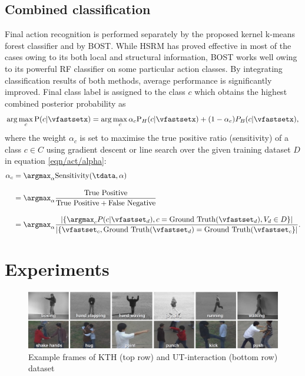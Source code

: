 \subsection{Combined classification} 
Final action recognition is performed separately by the proposed kernel k-means forest classifier and by BOST. While HSRM has proved effective in most of the cases owing to its both local and structural information, BOST works well owing to its powerful RF classifier on some particular action classes. By integrating classification results of both methods, average performance is significantly improved. Final class label is assigned to the class $c$ which obtains the highest combined posterior probability as
\begin{equation}
	\arg\max_{c}
	\mathrm{P}(c|\vfastsetx) = 
	\arg\max_{c}
	\alpha_c \mathrm{P}_{H}(c|\vfastsetx) + (1 - \alpha_c) P_{B}(c|\vfastsetx),
	\label{eqn/act/combine}
\end{equation}
where the weight $\alpha_c$ is set to maximise the true positive ratio (sensitivity) of a class $c \in C$ using gradient descent or line search over the given training dataset $D$ in equation \ref{eqn/act/alpha}:
\begin{equation}
\begin{aligned}
	\alpha_c & = \displaystyle\argmax_{\alpha}\mbox{Sensitivity}(\tdata,\alpha) \\[3mm]
	& = \displaystyle\argmax_{\alpha}\displaystyle\frac{\mbox{True Positive}}{\mbox{True Positive} + \mbox{False Negative}} \\[3mm]
&= \displaystyle\argmax_{\alpha}\displaystyle\frac{\left|\{\displaystyle\argmax_{c}P(c|\vfastset_d),c=\mbox{Ground Truth}(\vfastset_d),V_d \in D\}\right|}{\left|\{\vfastset_c, \mbox{Ground Truth}(\vfastset_d) = \mbox{Ground Truth}(\vfastset_c\}\right|}.
\end{aligned}
\label{eqn/act/alpha}
\end{equation}

\section{Experiments}
\label{sec/act/experiments}

\begin{figure}[ht]
	\centering
	\includegraphics[width=1\linewidth]{fig/act/frames.png}
	\caption{Example frames of KTH (top row) and UT-interaction (bottom row) dataset}
	\label{fig/act/frames}
\end{figure}

